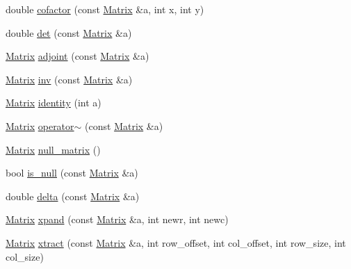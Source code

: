 \begin{DoxyCompactItemize}
\item 
double \hyperlink{namespacechittmatrix_ab0029fd35b2b5cd4766d323e81d3925e}{cofactor} (const \hyperlink{classchittmatrix_1_1Matrix}{\-Matrix} \&a, int x, int y)
\item 
double \hyperlink{namespacechittmatrix_adba4f8f5596eacc68d2499e8ab830abc}{det} (const \hyperlink{classchittmatrix_1_1Matrix}{\-Matrix} \&a)
\item 
\hyperlink{classchittmatrix_1_1Matrix}{\-Matrix} \hyperlink{namespacechittmatrix_a0f77d9209d8e8124dad2eb8327ff58ad}{adjoint} (const \hyperlink{classchittmatrix_1_1Matrix}{\-Matrix} \&a)
\item 
\hyperlink{classchittmatrix_1_1Matrix}{\-Matrix} \hyperlink{namespacechittmatrix_ae63a74411c37fdb83bee915168366af3}{inv} (const \hyperlink{classchittmatrix_1_1Matrix}{\-Matrix} \&a)
\item 
\hyperlink{classchittmatrix_1_1Matrix}{\-Matrix} \hyperlink{namespacechittmatrix_a7147845e7580c90912298344493de611}{identity} (int a)
\item 
\hyperlink{classchittmatrix_1_1Matrix}{\-Matrix} \hyperlink{namespacechittmatrix_a8f29ba8f4625756d105b6213c5b4c7b9}{operator$\sim$} (const \hyperlink{classchittmatrix_1_1Matrix}{\-Matrix} \&a)
\item 
\hyperlink{classchittmatrix_1_1Matrix}{\-Matrix} \hyperlink{namespacechittmatrix_ad932756475852a7fc1f52ee8506f7ccf}{null\-\_\-matrix} ()
\item 
bool \hyperlink{namespacechittmatrix_adc1f6f699558901079a0c3cafbd4c287}{is\-\_\-null} (const \hyperlink{classchittmatrix_1_1Matrix}{\-Matrix} \&a)
\item 
double \hyperlink{namespacechittmatrix_ab9ef0a3436b96a3c281ba9ccc9e86d10}{delta} (const \hyperlink{classchittmatrix_1_1Matrix}{\-Matrix} \&a)
\item 
\hyperlink{classchittmatrix_1_1Matrix}{\-Matrix} \hyperlink{namespacechittmatrix_ac44d746271219385798e82ff29deded8}{xpand} (const \hyperlink{classchittmatrix_1_1Matrix}{\-Matrix} \&a, int newr, int newc)
\item 
\hyperlink{classchittmatrix_1_1Matrix}{\-Matrix} \hyperlink{namespacechittmatrix_aa31841005f246269f7f71ba84dac7055}{xtract} (const \hyperlink{classchittmatrix_1_1Matrix}{\-Matrix} \&a, int row\-\_\-offset, int col\-\_\-offset, int row\-\_\-size, int col\-\_\-size)
\end{DoxyCompactItemize}


